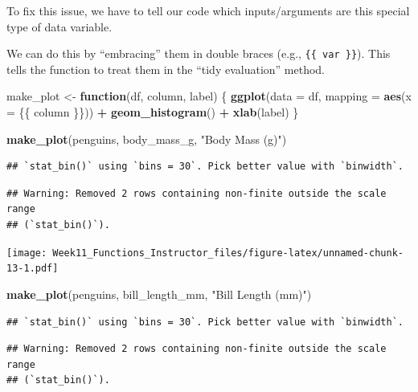 \documentclass[
]{article}
\newenvironment{Shaded}{\begin{snugshade}}{\end{snugshade}}
\newcommand{\AttributeTok}[1]{\textcolor[rgb]{0.13,0.29,0.53}{#1}}
\newcommand{\ControlFlowTok}[1]{\textcolor[rgb]{0.13,0.29,0.53}{\textbf{#1}}}
\newcommand{\FunctionTok}[1]{\textcolor[rgb]{0.13,0.29,0.53}{\textbf{#1}}}
\newcommand{\NormalTok}[1]{#1}
\newcommand{\OtherTok}[1]{\textcolor[rgb]{0.56,0.35,0.01}{#1}}
\newcommand{\SpecialCharTok}[1]{\textcolor[rgb]{0.81,0.36,0.00}{\textbf{#1}}}
\newcommand{\StringTok}[1]{\textcolor[rgb]{0.31,0.60,0.02}{#1}}
\begin{document}
To fix this issue, we have to tell our code which inputs/arguments are
this special type of data variable.

We can do this by ``embracing'' them in double braces (e.g.,
\texttt{\{\{\ var\ \}\}}). This tells the function to treat them in the
``tidy evaluation'' method.

\begin{Shaded}
\begin{Highlighting}[]
\NormalTok{make\_plot }\OtherTok{\textless{}{-}} \ControlFlowTok{function}\NormalTok{(df, column, label) \{}
    \FunctionTok{ggplot}\NormalTok{(}\AttributeTok{data =}\NormalTok{ df, }\AttributeTok{mapping =} \FunctionTok{aes}\NormalTok{(}\AttributeTok{x =}\NormalTok{ \{\{ column \}\})) }\SpecialCharTok{+}
    \FunctionTok{geom\_histogram}\NormalTok{() }\SpecialCharTok{+}
    \FunctionTok{xlab}\NormalTok{(label)}
\NormalTok{\}}

\FunctionTok{make\_plot}\NormalTok{(penguins, body\_mass\_g, }\StringTok{"Body Mass (g)"}\NormalTok{)}
\end{Highlighting}
\end{Shaded}

\begin{verbatim}
## `stat_bin()` using `bins = 30`. Pick better value with `binwidth`.
\end{verbatim}

\begin{verbatim}
## Warning: Removed 2 rows containing non-finite outside the scale range
## (`stat_bin()`).
\end{verbatim}

\texttt{[image: Week11\_Functions\_Instructor\_files/figure-latex/unnamed-chunk-13-1.pdf]}

\begin{Shaded}
\begin{Highlighting}[]
\FunctionTok{make\_plot}\NormalTok{(penguins, bill\_length\_mm, }\StringTok{"Bill Length (mm)"}\NormalTok{)}
\end{Highlighting}
\end{Shaded}

\begin{verbatim}
## `stat_bin()` using `bins = 30`. Pick better value with `binwidth`.
\end{verbatim}

\begin{verbatim}
## Warning: Removed 2 rows containing non-finite outside the scale range
## (`stat_bin()`).
\end{verbatim}
\end{document}
